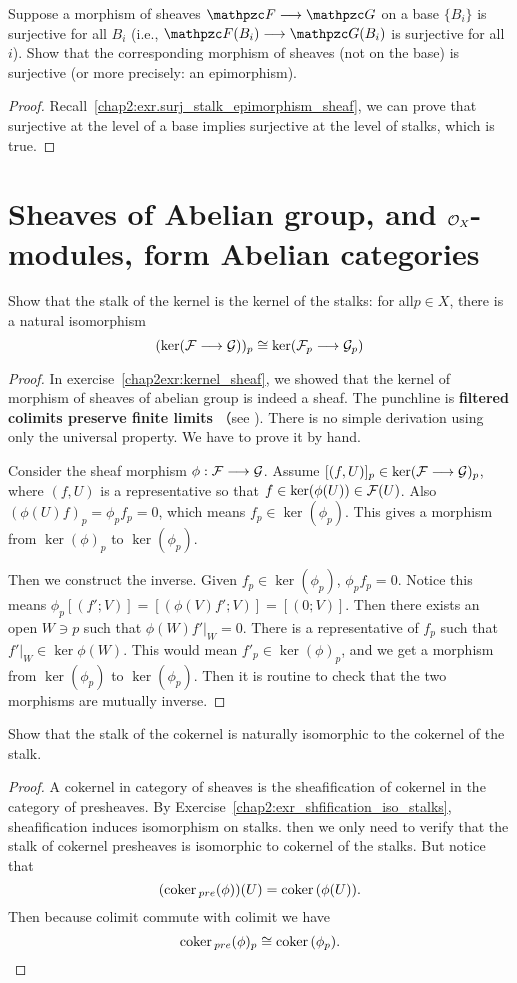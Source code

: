\documentclass[11pt]{book} %
\begin{document}
\begin{exr}
Suppose a morphism of sheaves $\pzf\lrta\pzg$ on a base $\{B_i\}$ is surjective for all $B_i$ (i.e., $\pzf(B_i) \lrta \pzg(B_i)$ is surjective for all $i$). Show that the corresponding morphism of sheaves (not on the base) is surjective (or more precisely: an epimorphism).
\end{exr}
\begin{proof}
Recall~\ref{chap2:exr.surj_stalk_epimorphism_sheaf}, we can prove that surjective at the level of a base implies surjective at the level of stalks, which is true.
\end{proof}




\section{Sheaves of Abelian group, and ${\cal O}_X$-modules, form Abelian categories}
\begin{exr}
Show that the stalk of the kernel is the kernel of the stalks: for all$ p \in  X$, there is a natural isomorphism
$$
(\ker({\cal F}\longrightarrow {\cal G}))_p\cong \ker ({\cal F}_p\longrightarrow {\cal G}_p)
$$
\end{exr}
\begin{proof}
In exercise~\ref{chap2exr:kernel_sheaf}, we showed that the kernel of morphism of sheaves of abelian group is indeed a sheaf. The punchline is \textbf{filtered colimits preserve finite limits} （see \cite[p.~216]{mac1998categories}). There is no simple derivation using only the universal property. We have to prove it by hand. 

Consider the sheaf morphism $\phi:{\cal F}\longrightarrow {\cal G}$.
Assume $[(f,U)]_p\in \ker({\cal F}\longrightarrow{\cal G})_p$, where $(f,U)$ is a representative so that $f\in \ker (\phi(U))\in {\cal F}(U)$.  Also $(\phi(U)f)_p=\phi_pf_p=0$, which means $f_p\in \ker(\phi_p)$. This gives a morphism from $\ker(\phi)_p$ to $\ker(\phi_p)$.

Then we construct the inverse. Given $f_p\in \ker(\phi_p)$, $\phi_pf_p=0$. Notice this means $\phi_p[(f';V)]=[(\phi(V)f';V)]=[(0;V)]$. Then there exists an open $W\ni p$ such that $\phi(W)f'|_W=0$. There is a representative of $f_p$ such that $f'|_W\in\ker \phi(W)$. This would mean $f'_p\in\ker(\phi)_p$, and we get a morphism from $\ker(\phi_p)$ to $\ker(\phi_p)$. Then it is routine to check that the two morphisms are mutually inverse.
\end{proof}

\begin{exr}
Show that the stalk of the cokernel is naturally isomorphic to the cokernel of the stalk.
\end{exr}
\begin{proof}
A cokernel in category of sheaves is the sheafification of cokernel in the category of presheaves. By Exercise~\ref{chap2:exr_shfification_iso_stalks}, sheafification induces isomorphism on stalks. then we only need to verify that the stalk of cokernel presheaves is isomorphic to cokernel of the stalks. But notice that 
$$
(\text{coker\,}_{pre}(\phi))(U)=\text{coker\,}(\phi(U)).
$$
Then because colimit commute with colimit we have 
$$
\text{coker\,}_{pre}(\phi)_p\cong \text{coker\,}(\phi_p).
$$
\end{proof}
\end{document}
